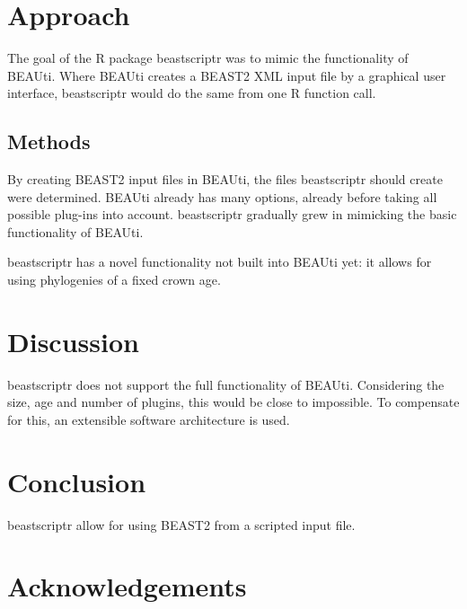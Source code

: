 \documentclass{bioinfo}
\begin{document}
\section{Approach}

The goal of the R package beastscriptr was to mimic the functionality of BEAUti.
Where BEAUti creates a BEAST2 XML input file by a graphical user interface,
beastscriptr would do the same from one R function call.

\begin{methods}
\section{Methods}

By creating BEAST2 input files in BEAUti, the files beastscriptr should
create were determined. BEAUti already has many options, already
before taking all possible plug-ins into account. beastscriptr 
gradually grew in mimicking the basic functionality of BEAUti.

beastscriptr has a novel functionality not built into BEAUti yet:
it allows for using phylogenies of a fixed crown age. 

\end{methods}

\section{Discussion}

beastscriptr does not support the full functionality of BEAUti. Considering
the size, age and number of plugins, this would be close to impossible.
To compensate for this, an extensible software architecture is used.

\section{Conclusion}

beastscriptr allow for using BEAST2 from a scripted input file.

\section*{Acknowledgements}
\end{document}
